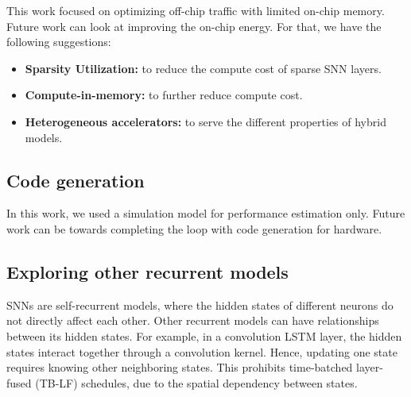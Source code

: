 This work focused on optimizing off-chip traffic with limited on-chip memory. Future work can look at improving the on-chip energy. For that, we have the following suggestions:
\begin{itemize}
    \item \textbf{Sparsity Utilization:} to reduce the compute cost of sparse SNN layers. 
    \item \textbf{Compute-in-memory:} to further reduce compute cost.
    \item \textbf{Heterogeneous accelerators:} to serve the different properties of hybrid models.
\end{itemize}
%








\subsection*{Code generation}

In this work, we used a simulation model for performance estimation only. Future work can be towards completing the loop with code generation for hardware. 

\subsection*{Exploring other recurrent models}

SNNs are self-recurrent models, where the hidden states of different neurons do not directly affect each other. Other recurrent models can have relationships between its hidden states. For example, in a convolution LSTM layer, the hidden states interact together through a convolution kernel. Hence, updating one state requires knowing other neighboring states. This prohibits time-batched layer-fused (TB-LF) schedules, due to the spatial dependency between states.

